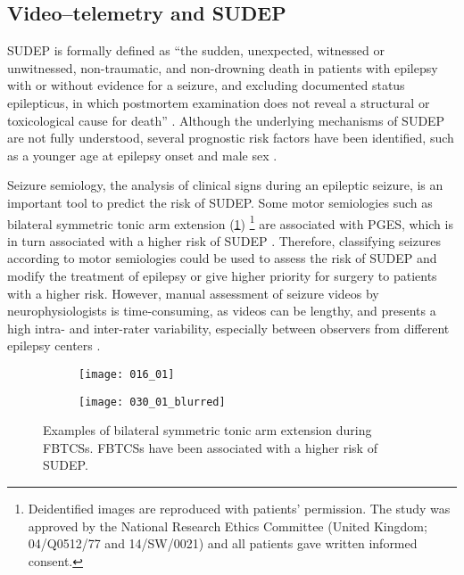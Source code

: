 \subsection{Video--telemetry and SUDEP}

\acs{SUDEP} is formally defined as ``the sudden, unexpected, witnessed or unwitnessed, non-traumatic, and non-drowning death in patients with epilepsy with or without evidence for a seizure, and excluding documented status epilepticus, in which postmortem examination does not reveal a structural or toxicological cause for death'' \cite{nashef_sudden_1997}.
Although the underlying mechanisms of \ac{SUDEP} are not fully understood, several prognostic risk factors have been identified, such as a younger age at epilepsy onset and male sex \cite{so_what_2008,jha_sudden_2021}.

Seizure semiology, the analysis of clinical signs during an epileptic seizure, is an important tool to predict the risk of \ac{SUDEP}.
Some motor semiologies such as bilateral symmetric tonic arm extension (\cref{fig:decerebration})%
\footnote{Deidentified images are reproduced with patients' permission. The study was approved by the National Research Ethics Committee (United Kingdom; 04/Q0512/77 and 14/SW/0021) and all patients gave written informed consent.} %
are associated with \ac{PGES}, which is in turn associated with a higher risk of \ac{SUDEP} \cite{alexandre_risk_2015,vilella_association_2021}.
Therefore, classifying seizures according to motor semiologies could be used to assess the risk of \ac{SUDEP} and modify the treatment of epilepsy or give higher priority for surgery to patients with a higher risk.
However, manual assessment of seizure videos by neurophysiologists is time-consuming, as videos can be lengthy, and presents a high intra- and inter-rater variability, especially between observers from different epilepsy centers \cite{tufenkjian_seizure_2012}.

\begin{figure}
  \centering

  \begin{subfigure}{0.49\linewidth}
    \texttt{[image: 016\_01]}
  \end{subfigure}
  \begin{subfigure}{0.49\linewidth}
    \texttt{[image: 030\_01\_blurred]}
  \end{subfigure}
  \caption[Examples of bilateral symmetric tonic arm extension]{
    Examples of bilateral symmetric tonic arm extension during \acfp*{FBTCS}.
    \acsp{FBTCS} have been associated with a higher risk of \acf*{SUDEP}.
  }
  \label{fig:decerebration}
\end{figure}

